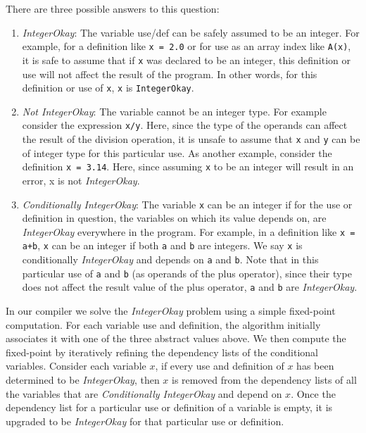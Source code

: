There are three possible answers to this question: 
\begin{enumerate}

\item \emph{IntegerOkay}: The variable use/def can be safely assumed to be an
integer.  For example, for a definition like \texttt{x = 2.0} or for use
as an array index like \texttt{A(x)}, it is safe to assume that if
\verb|x| was declared to be an integer, this definition or use will not
affect the result of the program. In other words, for this definition or
use of \verb|x|, \verb|x| is \texttt{IntegerOkay}.

\item \emph{Not IntegerOkay}: The variable cannot be an integer type.
For example consider the expression \texttt{x/y}. Here, since the type
of the operands can affect the result of the division operation, it is
unsafe to assume that \verb|x| and \verb|y| can be of integer type for
this particular use. As another example, consider the definition
\texttt{x = 3.14}. Here, since assuming \verb|x| to be an integer will
result in an error, x is not \emph{IntegerOkay}. 

\item \emph{Conditionally IntegerOkay}: The variable \verb|x| can be
an integer if for the use or definition in question, the variables on
which its value depends on, are \emph{IntegerOkay} everywhere in the
program. For example, in a definition like \texttt{x = a+b}, \verb|x|
can be an integer if both \verb|a| and \verb|b| are integers. We say
\verb|x| is conditionally \emph{IntegerOkay} and depends on \verb|a| and
\verb|b|. Note that in this particular use of \verb|a| and \verb|b| (as
operands of the plus operator), since their type does not affect the
result value of the plus operator, \verb|a| and \verb|b| are
\emph{IntegerOkay}.        

\end{enumerate}   

In our \mixten compiler we solve the \emph{IntegerOkay} problem using a
simple fixed-point computation.   For each variable use and definition,
the algorithm initially associates it with one of the three abstract
values above.  
We then compute the fixed-point by iteratively refining the dependency lists
of the conditional variables.  Consider each variable $x$, if every use
and definition of $x$ has been determined to be \emph{IntegerOkay}, then
$x$ is removed from the dependency lists of all the variables that are
\emph{Conditionally IntegerOkay} and depend on $x$.  Once the dependency
list for a particular use or definition of a variable is empty, it is
upgraded to be \emph{IntegerOkay} for that particular use or definition.

